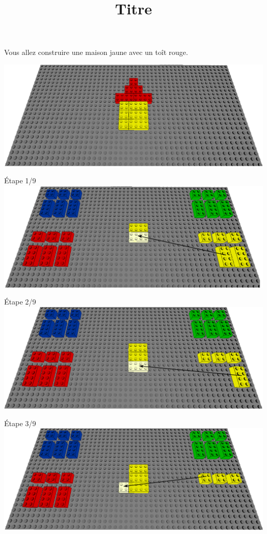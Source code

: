 \documentclass[aspectratio=169]{beamer}
\title{Titre}
\begin{document}
\begin{frame}
    Vous allez construire une maison jaune avec un toît rouge.
    \vfill
  \begin{center}
      \includegraphics[width=\linewidth]{figure.png}
  \end{center}
\end{frame}

\begin{frame}
    Étape 1/9
    \vfill
  \includegraphics[width=\linewidth]{step1.png}
\end{frame}

\begin{frame}
    Étape 2/9
    \vfill
  \includegraphics[width=\linewidth]{step2.png}
\end{frame}

\begin{frame}
    Étape 3/9
    \vfill
  \includegraphics[width=\linewidth]{step3.png}
\end{frame}
\end{document}
